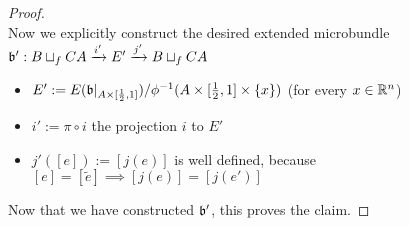 \begin{proof}
    \\ Now we explicitly construct the desired extended microbundle $\bundleb':\bundle{B \sqcup_f CA}{E'}{i'}{j'}$
    \begin{itemize}
        \item $E' := E(\bundleb\restrict{A \times [\frac{1}{2}, 1]}) / \phi^{-1}(A \times [\frac{1}{2}, 1] \times \{x\})$ (for every $x \in \R^n$)
        \item $i' := \pi \circ i$ the projection $i$ to $E'$
        \item $j'([e]) := [j(e)]$ is well defined, because $[e] = [\tilde{e}] \implies [j(e)] = [j(e')]$
    \end{itemize}
    Now that we have constructed $\bundleb'$, this proves the claim.
\end{proof}
